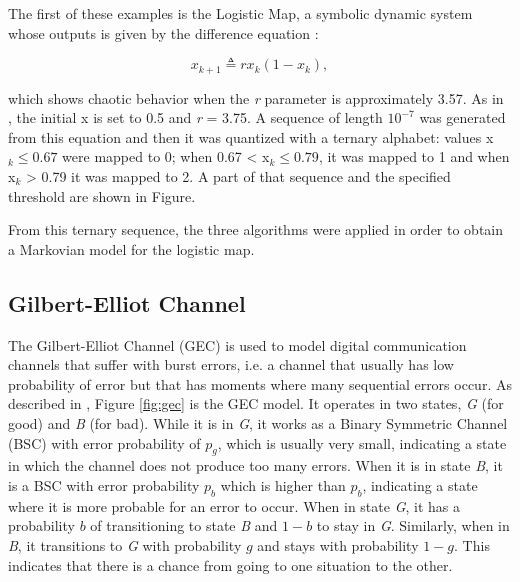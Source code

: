 {The first of these examples is the Logistic Map, a symbolic dynamic system whose outputs is given by the difference equation \cite{asok.14}:

\begin{equation}
x_{k+1} \triangleq rx_k(1-x_k), \label{eq:logisticmap}
\end{equation}


\noindent which shows chaotic behavior when the \textit{r} parameter is approximately 3.57. As in \cite{asok.14}, the initial x is set to 0.5 and \textit{r} = 3.75. A sequence of length $10^{-7}$ was generated from this equation and then it was quantized with a ternary alphabet: values x$_k \leq 0.67$ were mapped to 0; when 0.67 < x$_k \leq 0.79$, it was mapped to 1 and when x$_k$ > 0.79 it was mapped to 2. A part of that sequence and the specified threshold are shown in Figure.


From this ternary sequence, the three algorithms were applied in order to obtain a Markovian model for the logistic map.

\subsection{Gilbert-Elliot Channel}

The Gilbert-Elliot Channel (GEC) is used to model digital communication channels that suffer with burst errors, i.e. a channel that usually has low probability of error but that has moments where many sequential errors occur. As described in \cite{mushkin.89}, Figure \ref{fig:gec} is the GEC model. It operates in two states, \textit{G} (for good) and \textit{B} (for bad). While it is in \textit{G}, it works as a Binary Symmetric Channel (BSC) with error probability of $p_g$, which is usually very small, indicating a state in which the channel does not produce too many errors. When it is in state \textit{B}, it is a BSC with error probability $p_b$ which is higher than $p_b$, indicating a state where it is more probable for an error to occur. When in state \textit{G}, it has a probability $b$ of transitioning to state \textit{B} and $1-b$ to stay in \textit{G}. Similarly, when in \textit{B}, it transitions to \textit{G} with probability $g$ and stays with probability $1-g$. This indicates that there is a chance from going to one situation to the other.

}
